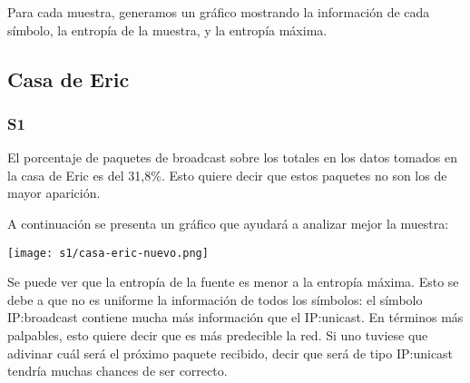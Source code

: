 

Para cada muestra, generamos un gráfico mostrando la información de cada símbolo,
la entropía de la muestra, y la entropía máxima.

\subsection{Casa de Eric}
\subsubsection{S1}
El porcentaje de paquetes de broadcast sobre los totales en los datos tomados en la 
casa de Eric es del 31,8\%. Esto quiere decir que estos paquetes no son los de 
mayor aparición. 

A continuación se presenta un gráfico que ayudará a analizar mejor
la muestra:

\texttt{[image: s1/casa-eric-nuevo.png]}


Se puede ver que la entropía de la fuente es menor a la entropía máxima. Esto
se debe a que no es uniforme la información de todos los símbolos: el símbolo
IP:broadcast contiene mucha más información que el IP:unicast. En términos más
palpables, esto quiere decir que es más predecible la red. Si uno tuviese que
adivinar cuál será el próximo paquete recibido, decir que será de tipo
IP:unicast tendría muchas chances de ser correcto.

